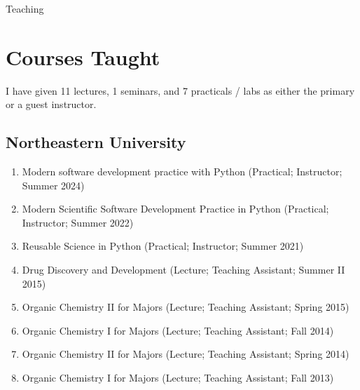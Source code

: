 \documentclass[10pt,a4paper,sans]{moderncv} %
\begin{document}
\pagebreak
{\huge Teaching}

    \section{Courses Taught}\label{sec:courses}

    I have given 11 lectures,
    1 seminars,
    and 7 practicals / labs
    as either the primary or a guest instructor.

        \subsection{Northeastern University}
        \begin{enumerate}
        \item     Modern software development practice with Python (Practical; Instructor; Summer 2024)

        \item     Modern Scientific Software Development Practice in Python (Practical; Instructor; Summer 2022)

        \item     Reusable Science in Python (Practical; Instructor; Summer 2021)

        \item     Drug Discovery and Development (Lecture; Teaching Assistant; Summer II 2015)

        \item     Organic Chemistry II for Majors (Lecture; Teaching Assistant; Spring 2015)

        \item     Organic Chemistry I for Majors (Lecture; Teaching Assistant; Fall 2014)

        \item     Organic Chemistry II for Majors (Lecture; Teaching Assistant; Spring 2014)

        \item     Organic Chemistry I for Majors (Lecture; Teaching Assistant; Fall 2013)

        \end{enumerate}
\end{document}

